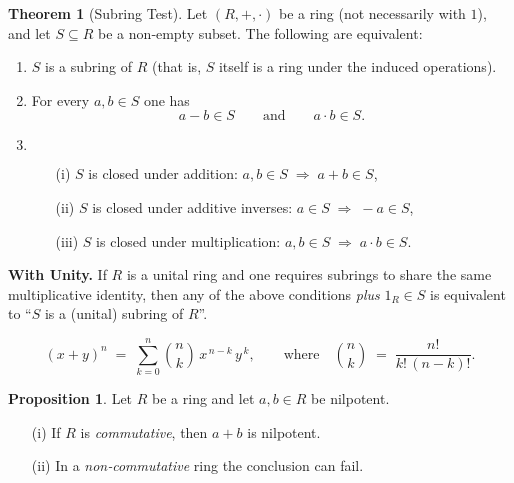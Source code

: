 \documentclass[12pt]{article}
\theoremstyle{definition} %
\newtheorem{proposition}{Proposition}
\newtheorem{theorem}{Theorem}
\theoremstyle{plain} %
\begin{document}
      \begin{theorem}[Subring Test]
        Let $(R,+,\cdot)$ be a ring (not necessarily with $1$), and let $S\subseteq R$ be a non‑empty subset.
        The following are equivalent:
        \begin{enumerate}
          \item $S$ is a subring of $R$ (that is, $S$ itself is a ring under the induced operations).
          \item For every $a,b\in S$ one has
                \[
                   a-b\in S \qquad\text{and}\qquad a\cdot b\in S.
                \]
          \item $\;$\begin{enumerate}
                    \item[(i)] $S$ is closed under addition: $a,b\in S\;\Longrightarrow\;a+b\in S$,
                    \item[(ii)] $S$ is closed under additive inverses: $a\in S\;\Longrightarrow\;-a\in S$,
                    \item[(iii)] $S$ is closed under multiplication: $a,b\in S\;\Longrightarrow\;a\cdot b\in S$.
                 \end{enumerate}
        \end{enumerate}
      
        \noindent
        \textbf{With Unity.}  
        If $R$ is a unital ring and one requires subrings to share the same multiplicative identity,
        then any of the above conditions \emph{plus} $1_R\in S$ is equivalent to “$S$ is a (unital) subring of $R$”.
      \end{theorem}
      \[
  (x + y)^{n} \;=\; \sum_{k = 0}^{n} \binom{n}{k}\, x^{\,n-k}\, y^{\,k},
  \qquad\text{where}\quad
  \binom{n}{k} \;=\; \frac{n!}{k!\,(n-k)!}.
\]
\begin{proposition}
  Let $R$ be a ring and let $a,b\in R$ be nilpotent.
  \begin{enumerate}
    \item[\textup{(i)}]  If $R$ is \emph{commutative}, then $a+b$ is nilpotent.
    \item[\textup{(ii)}] In a \emph{non‑commutative} ring the conclusion can fail.
  \end{enumerate}
\end{proposition}
\end{document}
